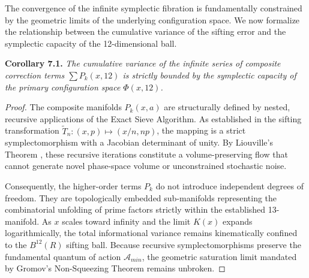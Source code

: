 \documentclass[sn-mathphys-num, pdflatex, referee]{sn-jnl}
\begin{document}
The convergence of the infinite symplectic fibration is fundamentally constrained by the geometric limits of the underlying configuration space. We now formalize the relationship between the cumulative variance of the sifting error and the symplectic capacity of the 12-dimensional ball.

\textbf{Corollary 7.1.} \textit{The cumulative variance of the infinite series of composite correction terms $\sum P_k(x,12)$ is strictly bounded by the symplectic capacity of the primary configuration space $\Phi(x,12)$.}

\begin{proof}
The composite manifolds $P_k(x,a)$ are structurally defined by nested, recursive applications of the Exact Sieve Algorithm. As established in the sifting transformation $\tilde{T}_n: (x,p) \mapsto (x/n, np)$, the mapping is a strict symplectomorphism with a Jacobian determinant of unity. By Liouville's Theorem \cite{arnold1989}, these recursive iterations constitute a volume-preserving flow that cannot generate novel phase-space volume or unconstrained stochastic noise.

Consequently, the higher-order terms $P_k$ do not introduce independent degrees of freedom. They are topologically embedded sub-manifolds representing the combinatorial unfolding of prime factors strictly within the established 13-manifold. As $x$ scales toward infinity and the limit $K(x)$ expands logarithmically, the total informational variance remains kinematically confined to the $B^{12}(R)$ sifting ball. Because recursive symplectomorphisms preserve the fundamental quantum of action $\mathcal{A}_{min}$, the geometric saturation limit mandated by Gromov's Non-Squeezing Theorem remains unbroken.


\end{proof}
\end{document}
